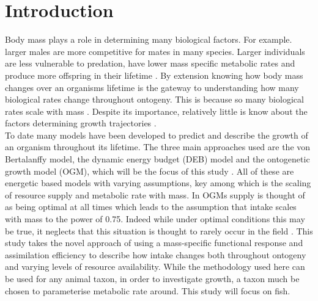 \documentclass[a4paper, 11pt, hidelinks]{article} %
\begin{document}
	\tableofcontents
	\newpage

\section{Introduction}
	\linenumbers

	Body mass plays a role in determining many biological factors.  For example. larger males are more competitive for mates in many species.  Larger individuals are less vulnerable to predation, have lower mass specific metabolic rates and produce more offspring in their lifetime \parencite{Peters1983, Barneche2018, Craig2006, Magnhagen2001, Hixon2014, Marshall2006}.
	By extension knowing how body mass changes over an organisms lifetime is the gateway to understanding how many biological rates change throughout ontogeny.  This is because so many biological rates scale with mass \parencite{Kleiber1932}.  Despite its importance, relatively little is know about the factors determining growth trajectories \parencite{Arendt2011, Marshall2019}.\\
	To date many models have been developed to predict and describe the growth of an organism throughout its lifetime.  The three main approaches used are the von Bertalanffy model, the dynamic energy budget (DEB) model and the ontogenetic growth model (OGM), which will be the focus of this study \parencite{Putter1918, vonBertalanffy1938, Kooijman1986, West2001}.  All of these are energetic based models with varying assumptions, key among which is the scaling of resource supply and metabolic rate with mass.   In OGMs supply is thought of as being optimal at all times which leads to the assumption that intake scales with mass to the power of 0.75.  Indeed while under optimal conditions this may be true, it neglects that this situation is thought to rarely occur in the field \parencite{Pawar2012}.
	This study takes the novel approach of using a mass-specific functional response and assimilation efficiency to describe how intake changes both throughout ontogeny and varying levels of resource availability. While the methodology used here can be used for any animal taxon, in order to investigate growth, a taxon much be chosen to parameterise metabolic rate around.  This study will focus on fish.
		
\end{document}
